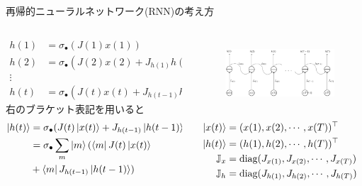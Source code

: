 \documentclass[dvipdfmx,10pt]{beamer}
\begin{document}
  \begin{frame}[t]{再帰的ニューラルネットワーク(RNN)の考え方}
    \begin{columns}
      \begin{column}{0.5\textwidth}
        \begin{align*}
          h(1) &= \sigma_{\bullet}(J(1)x(1))\\
          h(2) &= \sigma_{\bullet}(J(2)x(2) + J_{h(1)}h(1))\\
          \vdots\\
          h(t) &= \sigma_{\bullet}(J(t)x(t) + J_{h(t-1)}h(t-1))
        \end{align*}
        右のブラケット表記を用いると
        \begin{align*}
          \ket{h(t)} &= \sigma_{\bullet}(J(t)\ket{x(t)} + J_{h(t-1)}\ket{h(t-1)})\\
          &= \sigma_{\bullet}\sum_{m}\ket{m}(\bra{m}J(t)\ket{x(t)} \\
          &+ \bra{m}J_{h(t-1)}\ket{h(t-1)})
        \end{align*}
      \end{column}
      \begin{column}{0.5\textwidth}
        \begin{figure}
          \begin{center}
            \includegraphics[height=2.6cm]{simple_RNN.png}
          \end{center} 
        \end{figure}
        \begin{align*}
          \ket{x(t)} &= (x(1),x(2),\cdots,x(T))^{\top}\\
          \ket{h(t)} &= (h(1),h(2),\cdots,h(T))^{\top}\\
          \mathbb{J}_x &= \text{diag}(J_{x(1)},J_{x(2)},\cdots,J_{x(T)})\\
          \mathbb{J}_h &= \text{diag}(J_{h(1)},J_{h(2)},\cdots,J_{h(T)})
        \end{align*}
      \end{column}
    \end{columns}
  \end{frame}
\end{document}

